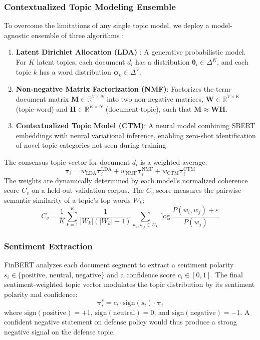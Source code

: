 \documentclass[11pt]{article}
\begin{document}
\subsubsection{Contextualized Topic Modeling Ensemble}
To overcome the limitations of any single topic model, we deploy a model-agnostic ensemble of three algorithms \cite{bhandari2025, seng2023, mishev2022}:
\begin{enumerate}[leftmargin=*, itemsep=0pt, topsep=4pt]
    \item \textbf{Latent Dirichlet Allocation (LDA)} \cite{bao2019}: A generative probabilistic model. For $K$ latent topics, each document $d_i$ has a distribution $\boldsymbol{\theta}_i \in \Delta^K$, and each topic $k$ has a word distribution $\boldsymbol{\phi}_k \in \Delta^V$.
    \item \textbf{Non-negative Matrix Factorization (NMF)}: Factorizes the term-document matrix $\mathbf{M} \in \mathbb{R}^{V \times N}$ into two non-negative matrices, $\mathbf{W} \in \mathbb{R}^{V \times K}$ (topic-word) and $\mathbf{H} \in \mathbb{R}^{K \times N}$ (document-topic), such that $\mathbf{M} \approx \mathbf{WH}$.
    \item \textbf{Contextualized Topic Model (CTM)}: A neural model combining SBERT embeddings with neural variational inference, enabling zero-shot identification of novel topic categories not seen during training.
\end{enumerate}
The consensus topic vector for document $d_i$ is a weighted average:
\begin{equation}
\boldsymbol{\tau}_i = w_{\text{LDA}} \boldsymbol{\tau}_i^{\text{LDA}} + w_{\text{NMF}} \boldsymbol{\tau}_i^{\text{NMF}} + w_{\text{CTM}} \boldsymbol{\tau}_i^{\text{CTM}}
\label{eq:ensemble_topic}
\end{equation}
The weights are dynamically determined by each model's normalized coherence score $C_v$ on a held-out validation corpus. The $C_v$ score measures the pairwise semantic similarity of a topic’s top words $W_k$:
\begin{equation}
C_v = \frac{1}{K} \sum_{k=1}^{K} \frac{1}{|W_k|(|W_k|-1)} \sum_{w_i, w_j \in W_k} \log \frac{P(w_i, w_j) + \varepsilon}{P(w_j)}
\label{eq:coherence}
\end{equation}

\subsubsection{Sentiment Extraction}
FinBERT \cite{paul2024} analyzes each document segment to extract a sentiment polarity $s_i \in \{\text{positive, neutral, negative}\}$ and a confidence score $c_i \in [0, 1]$. The final sentiment-weighted topic vector modulates the topic distribution by its sentiment polarity and confidence:
\begin{equation}
\boldsymbol{\tau}_i^s = c_i \cdot \text{sign}(s_i) \cdot \boldsymbol{\tau}_i
\label{eq:sentiment_weighted}
\end{equation}
where $\text{sign}(\text{positive}) = +1$, $\text{sign}(\text{neutral}) = 0$, and $\text{sign}(\text{negative}) = -1$. A confident negative statement on defense policy would thus produce a strong negative signal on the defense topic.
\end{document}
